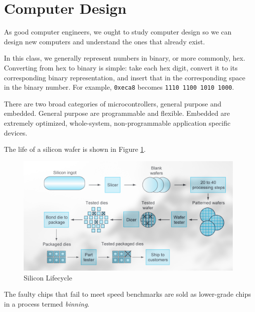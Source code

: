 \section{Computer Design}

As good computer engineers, we ought to study computer
design so we can design new computers and understand
the ones that already exist.

In this class, we generally represent numbers in
binary, or more commonly, hex. Converting from
hex to binary is simple: take each hex digit, convert
it to its corresponding binary representation, and
insert that in the corresponding space in the binary
number. For example, \texttt{0xeca8} becomes
\texttt{1110 1100 1010 1000}.

There are two broad categories of microcontrollers,
general purpose and embedded. General purpose are
programmable and flexible. Embedded are extremely
optimized, whole-system, non-programmable application
specific devices.

The life of a silicon wafer is shown in Figure
\ref{fig:silicon}.
\begin{figure}
    \includegraphics{images/silicon.png}
    \caption{Silicon Lifecycle}
    \label{fig:silicon}
\end{figure}
The faulty chips that fail to meet speed benchmarks
are sold as lower-grade chips in a process termed
\emph{binning}.

